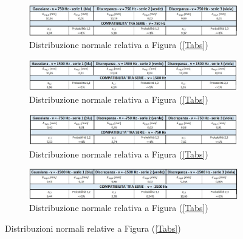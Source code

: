 \documentclass{article}
\begin{document}
\begin{figure}
    \centering
    \begin{subfigure}{\linewidth}
        \centering
        \includegraphics[width=\linewidth]{Coerenza_Gauss1.JPG}
        \caption{Distribuzione normale relativa a Figura (\ref{Tabs})}
        \label{Gauss_750}
    \end{subfigure}
    \newline
    \begin{subfigure}{\linewidth}
        \centering
        \includegraphics[width=\linewidth]{Coerenza_Gauss2.JPG}
        \caption{Distribuzione normale relativa a Figura (\ref{Tabs})}
        \label{Gauss_1500}  
    \end{subfigure}
    \newline
    \begin{subfigure}{\linewidth}
        \centering
        \includegraphics[width=\linewidth]{Coerenza_Gauss3.JPG}
        \caption{Distribuzione normale relativa a Figura (\ref{Tabs})}
        \label{Gauss_-750}     
    \end{subfigure}
    \newline
    \begin{subfigure}{\linewidth}
        \centering
        \includegraphics[width=\linewidth]{Coerenza_Gauss4.JPG}
        \caption{Distribuzione normale relativa a Figura (\ref{Tabs})}
        \label{Gauss_-1500}   
    \end{subfigure}
    \caption{Distribuzioni normali relative a Figura (\ref{Tabs})}
    \label{Gauss}
\end{figure}
\end{document}
